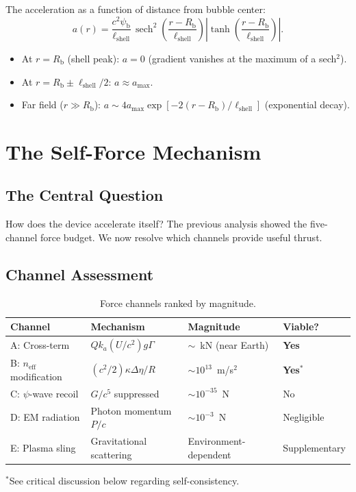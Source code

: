 \documentclass[12pt,aps,prd,superscriptaddress,nofootinbib,longbibliography]{revtex4-2}
\newcommand{\neff}{n_{\mathrm{eff}}}
\newcommand{\psib}{\psi_{\mathrm{b}}}
\newcommand{\ka}{k_a}
\newcommand{\Rb}{R_{\mathrm{b}}}
\newcommand{\Lshell}{\ell_{\mathrm{shell}}}
\begin{document}
The acceleration as a function of distance from bubble center:
\begin{equation}
a(r) = \frac{c^2\psib}{\Lshell}\,\operatorname{sech}^2\!\left(
\frac{r - \Rb}{\Lshell}\right)
\left|\tanh\!\left(\frac{r - \Rb}{\Lshell}\right)\right|.
\end{equation}

\begin{itemize}
\item At $r = \Rb$ (shell peak): $a = 0$ (gradient vanishes at the
maximum of a sech$^2$).
\item At $r = \Rb \pm \Lshell/2$: $a \approx a_{\mathrm{max}}$.
\item Far field ($r \gg \Rb$): $a \sim 4 a_{\mathrm{max}}
\exp[-2(r - \Rb)/\Lshell]$ (exponential decay).
\end{itemize}


\section{The Self-Force Mechanism}\label{sec:self-force}

\subsection{The Central Question}

How does the device accelerate itself?  The previous analysis showed
the five-channel force budget.  We now resolve which channels provide
useful thrust.

\subsection{Channel Assessment}

\begin{table}[h]
\caption{Force channels ranked by magnitude.}
\begin{ruledtabular}
\begin{tabular}{llll}
Channel & Mechanism & Magnitude & Viable? \\
\hline
A: Cross-term & $Q\ka(U/c^2)g\Gamma$ & $\sim$~kN (near Earth) & \textbf{Yes} \\
B: $\neff$ modification & $(c^2/2)\kappa\Delta\eta/R$ & $\sim 10^{13}$~m/s$^2$
  & \textbf{Yes}$^*$ \\
C: $\psi$-wave recoil & $G/c^5$ suppressed & $\sim 10^{-35}$~N & No \\
D: EM radiation & Photon momentum $P/c$ & $\sim 10^{-3}$~N & Negligible \\
E: Plasma sling & Gravitational scattering & Environment-dependent & Supplementary \\
\end{tabular}
\end{ruledtabular}
\begin{flushleft}
$^*$See critical discussion below regarding self-consistency.
\end{flushleft}
\end{table}
\end{document}
